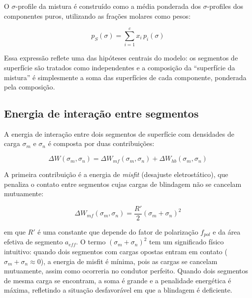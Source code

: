 O $\sigma$-profile da mistura é construído como a média ponderada dos $\sigma$-profiles dos componentes puros, utilizando as frações molares como pesos\cite{lin2002}:

\begin{equation}
    p_S(\sigma) = \sum_{i=1}^{c} x_i \, p_i(\sigma)
    \label{eq:sigma_profile_mistura}
\end{equation}

Essa expressão reflete uma das hipóteses centrais do modelo: os segmentos de superfície são tratados como independentes e a composição da ``superfície da mistura'' é simplesmente a soma das superfícies de cada componente, ponderada pela composição\cite{lin2002}.


\subsection{Energia de interação entre segmentos}
\label{subsec:cosmo_interacao}

A energia de interação entre dois segmentos de superfície com densidades de carga $\sigma_m$ e $\sigma_n$ é composta por duas contribuições\cite{lin2002}:

\begin{equation}
    \Delta W(\sigma_m, \sigma_n) =
    \Delta W_{mf}(\sigma_m, \sigma_n)
    + \Delta W_{hb}(\sigma_m, \sigma_n)
    \label{eq:energia_interacao}
\end{equation}

A primeira contribuição é a energia de \textit{misfit} (desajuste eletrostático), que penaliza o contato entre segmentos cujas cargas de blindagem não se cancelam mutuamente:

\begin{equation}
    \Delta W_{mf}(\sigma_m, \sigma_n) =
    \frac{R'}{2} (\sigma_m + \sigma_n)^2
    \label{eq:energia_misfit}
\end{equation}

\noindent em que $R'$ é uma constante que depende do fator de polarização $f_{pol}$ e da área efetiva de segmento $a_{eff}$. O termo $(\sigma_m + \sigma_n)^2$ tem um significado físico intuitivo: quando dois segmentos com cargas opostas entram em contato ($\sigma_m + \sigma_n \approx 0$), a energia de misfit é mínima, pois as cargas se cancelam mutuamente, assim como ocorreria no condutor perfeito. Quando dois segmentos de mesma carga se encontram, a soma é grande e a penalidade energética é máxima, refletindo a situação desfavorável em que a blindagem é deficiente\cite{lin2002}.

